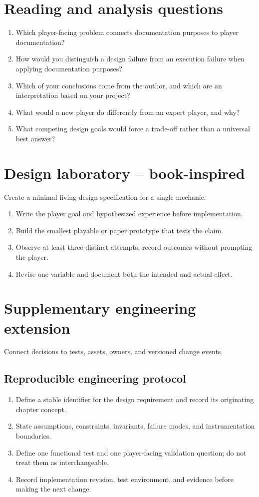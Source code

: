 \documentclass[11pt]{article}
\begin{document}
\section{Reading and analysis questions}
\begin{enumerate}
\item Which player-facing problem connects documentation purposes to player documentation?
\item How would you distinguish a design failure from an execution failure when applying documentation purposes?
\item Which of your conclusions come from the author, and which are an interpretation based on your project?
\item What would a new player do differently from an expert player, and why?
\item What competing design goals would force a trade-off rather than a universal best answer?
\end{enumerate}

\section{Design laboratory -- book-inspired}
Create a minimal living design specification for a single mechanic.

\begin{enumerate}
\item Write the player goal and hypothesized experience before implementation.
\item Build the smallest playable or paper prototype that tests the claim.
\item Observe at least three distinct attempts; record outcomes without prompting the player.
\item Revise one variable and document both the intended and actual effect.
\end{enumerate}

\section{Supplementary engineering extension}
Connect decisions to tests, assets, owners, and versioned change events.


\subsection{Reproducible engineering protocol}
\begin{enumerate}
\item Define a stable identifier for the design requirement and record its originating chapter concept.
\item State assumptions, constraints, invariants, failure modes, and instrumentation boundaries.
\item Define one functional test and one player-facing validation question; do not treat them as interchangeable.
\item Record implementation revision, test environment, and evidence before making the next change.
\end{enumerate}
\end{document}
